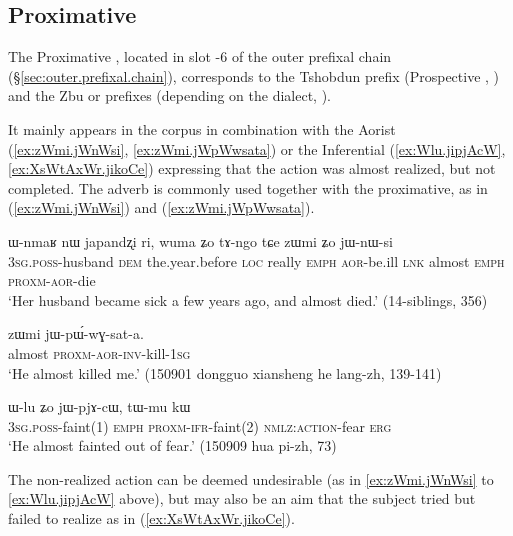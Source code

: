 \subsection{Proximative} \label{sec:proximative}
The Proximative , located in slot -6 of the outer prefixal chain (§\ref{sec:outer.prefixal.chain}), corresponds to the Tshobdun  prefix (Prospective , \citealt[142–143]{sun08shiti}) and the Zbu  or  prefixes (depending on the dialect, \citealt[9;201-202]{gong18these}).

It mainly appears in the corpus in combination with the Aorist (\ref{ex:zWmi.jWnWsi}, \ref{ex:zWmi.jWpWwsata}) or the Inferential (\ref{ex:Wlu.jipjAcW}, \ref{ex:XsWtAxWr.jikoCe}) expressing that the action was almost realized, but not completed. The adverb  is commonly used together with the proximative, as in (\ref{ex:zWmi.jWnWsi}) and (\ref{ex:zWmi.jWpWwsata}).

\begin{exe}
\ex \label{ex:zWmi.jWnWsi}
\gll ɯ-nmaʁ nɯ japandʐi ri, wuma ʑo tɤ-ngo tɕe zɯmi ʑo jɯ-nɯ-si \\
\textsc{3sg}.\textsc{poss}-husband \textsc{dem} the.year.before \textsc{loc} really \textsc{emph} \textsc{aor}-be.ill \textsc{lnk} almost \textsc{emph}  \textsc{proxm}-\textsc{aor}-die \\
\glt `Her husband became sick a few years ago, and almost died.' (14-siblings, 356)
  \end{exe}
  
  \begin{exe}
\ex \label{ex:zWmi.jWpWwsata}
\gll zɯmi jɯ-pɯ́-wɣ-sat-a. \\
almost \textsc{proxm}-\textsc{aor}-\textsc{inv}-kill-\textsc{1sg} \\
\glt `He almost killed me.' (150901 dongguo xiansheng he lang-zh, 139-141)
 \end{exe} 
 
\begin{exe}
\ex \label{ex:Wlu.jipjAcW}
\gll ɯ-lu ʑo jɯ-pjɤ-cɯ, tɯ-mu kɯ \\
\textsc{3sg}.\textsc{poss}-faint(1) \textsc{emph} \textsc{proxm}-\textsc{ifr}-faint(2) \textsc{nmlz}:\textsc{action}-fear \textsc{erg} \\
\glt `He almost fainted out of fear.' (150909 hua pi-zh, 73)
\end{exe}

The non-realized action can be deemed undesirable (as in \ref{ex:zWmi.jWnWsi} to \ref{ex:Wlu.jipjAcW} above), but may also be an aim that the subject tried but failed to realize as in (\ref{ex:XsWtAxWr.jikoCe}).

